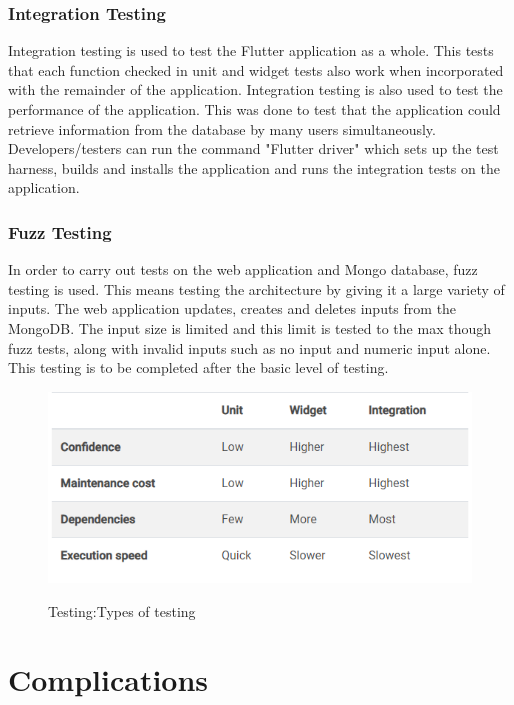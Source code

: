 \subsubsection{Integration Testing}

Integration testing is used to test the Flutter application as a whole. This tests that each function checked in unit and widget tests also work when incorporated with the remainder of the application. Integration testing is also used to test the performance of the application. This was done to test that the application could retrieve information from the database by many users simultaneously. Developers/testers can run the command "Flutter driver" which sets up the test harness, builds and installs the application and runs the integration tests on the application. \cite{IntegrationTest}

\subsubsection{Fuzz Testing}
In order to carry out tests on the web application and Mongo database, fuzz testing is used. This means testing the architecture by giving it a large variety of inputs. The web application updates, creates and deletes inputs from the MongoDB. The input size is limited and this limit is tested to the max though fuzz tests, along with invalid inputs such as no input and numeric input alone. This testing is to be completed after the basic level of testing.

\begin{figure}[ht!]
    \centering
 \includegraphics[width=125mm,scale=0.5]{img/Capture.PNG}
\caption{Testing:Types of testing}
\cite{testing}
\label{fig:method}
\end{figure}

\section{Complications}



